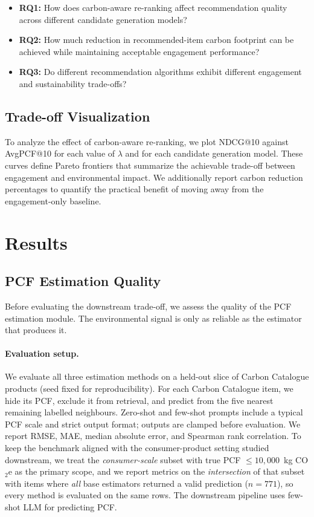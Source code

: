 \documentclass[11pt]{article}
\begin{document}
\begin{itemize}
    \item \textbf{RQ1:} How does carbon-aware re-ranking affect recommendation quality across different candidate generation models?
    \item \textbf{RQ2:} How much reduction in recommended-item carbon footprint can be achieved while maintaining acceptable engagement performance?
    \item \textbf{RQ3:} Do different recommendation algorithms exhibit different engagement and sustainability trade-offs?
\end{itemize}

\subsection{Trade-off Visualization}

To analyze the effect of carbon-aware re-ranking, we plot NDCG@10 against AvgPCF@10 for
each value of $\lambda$ and for each candidate generation model. These curves define Pareto
frontiers that summarize the achievable trade-off between engagement and environmental
impact. We additionally report carbon reduction percentages to quantify the practical
benefit of moving away from the engagement-only baseline.


\section{Results}\label{sec:results}

\subsection{PCF Estimation Quality}
\label{sec:pcf-results}

Before evaluating the downstream trade-off, we assess the quality of the PCF estimation
module. The environmental signal is only as reliable as the estimator that produces it.

\paragraph{Evaluation setup.}
We evaluate all three estimation methods on a held-out slice of Carbon Catalogue products
(seed fixed for reproducibility). For each Carbon Catalogue item, we hide its PCF, exclude
it from retrieval, and predict from the five nearest remaining labelled neighbours. Zero-shot
and few-shot prompts include a typical PCF scale and strict output format; outputs are
clamped before evaluation. We report RMSE, MAE, median absolute error, and Spearman rank
correlation. To keep the benchmark aligned with the consumer-product setting studied
downstream, we treat the \emph{consumer-scale} subset with true PCF $\leq
10{,}000$~kg CO$_2$e as the primary scope, and we report metrics on the
\emph{intersection} of that subset with items where \emph{all} base estimators returned a
valid prediction ($n=771$), so every method is evaluated on the same rows. The downstream
pipeline uses few-shot LLM for predicting PCF.
\end{document}
